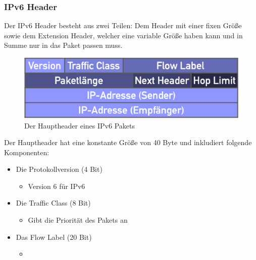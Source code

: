 \documentclass{article}
\begin{document}
	  \subsubsection{IPv6 Header}
	  Der IPv6 Header besteht aus zwei Teilen: Dem Header mit einer fixen Größe sowie dem Extension Header, welcher eine variable Größe haben kann und in Summe nur in das Paket passen muss. 
	  \begin{figure}[H]
	  \centering
	  \includegraphics{Bilder/IPv6.png}
	  \caption{Der Hauptheader eines IPv6 Pakets}
	  \end{figure}
	  Der Hauptheader hat eine konstante Größe von 40 Byte und inkludiert folgende Komponenten:
	  \begin{itemize}
	  	\item{Die Protokollversion (4 Bit)}
	  	\begin{itemize}
	  		\item{Version 6 für IPv6}
	  	\end{itemize}
	  	\item{Die Traffic Class (8 Bit)}
	  	\begin{itemize}
	  		\item{Gibt die Priorität des Pakets an}
	  	\end{itemize}
	  	\item{Das Flow Label (20 Bit)}
	  	\begin{itemize}
	  		\item{}
	  	\end{itemize}
	  \end{itemize}
\end{document}

